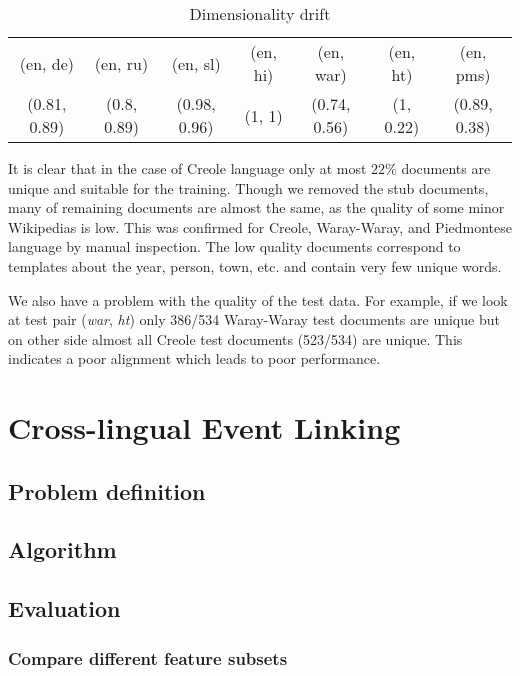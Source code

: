 \documentclass[twoside,11pt]{article}
\begin{document}
\begin{table}[h]
\caption{Dimensionality drift}
\label{table:rank}
\begin{tabular}{|c|c|c|c|c|c|c|}
\cline{1-7}
(en, de)     &   (en, ru)     &   (en, sl)       &     (en, hi)&   (en, war)      &      (en, ht) &   (en, pms)\\
\cline{1-7}
(0.81, 0.89)   &  (0.8, 0.89)  &   (0.98, 0.96)    &    (1, 1)  &   (0.74, 0.56)  &      (1, 0.22)  &   (0.89, 0.38)\\
\cline{1-7}
\end{tabular}
\end{table}

It is clear that in the case of Creole language only at most $22\%$ documents are unique and suitable for the training. Though we removed the stub documents, many of remaining documents are almost the same, as the quality of some minor Wikipedias is low. This was confirmed for Creole, Waray-Waray, and Piedmontese language by manual inspection. The low quality documents correspond to templates about the year, person, town, etc. and contain very few unique words.

We also have a problem with the quality of the test data. For example, if we look at test pair (\emph{war}, \emph{ht}) only 386/534 Waray-Waray test documents are unique but on other side almost all Creole test documents (523/534) are unique. This indicates a poor alignment which leads to poor performance.


\section{Cross-lingual Event Linking}

\subsection{Problem definition}

\subsection{Algorithm}

\subsection{Evaluation}

\subsubsection{Compare different feature subsets}
\end{document}
